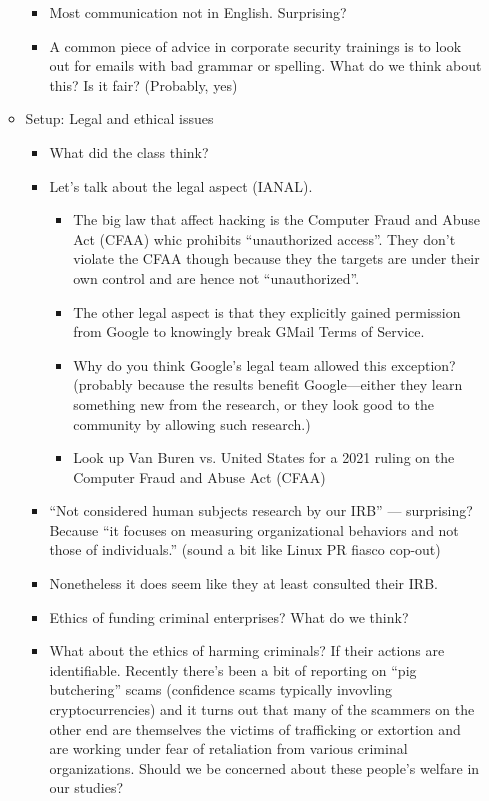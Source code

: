 \documentclass[11pt]{article}
\begin{document}
\begin{itemize}
\begin{itemize}
\begin{itemize}
            \item Most communication not in English. Surprising?
            \item A common piece of advice in corporate security trainings is to look out for emails with bad grammar or spelling. What do we think about this? Is it fair? (Probably, yes)
        \end{itemize}
        \item Setup: Legal and ethical issues
        \begin{itemize}
            \item What did the class think?
            \item Let's talk about the legal aspect (IANAL). 
            \begin{itemize}
                \item The big law that affect hacking is the Computer Fraud and Abuse Act (CFAA) whic prohibits ``unauthorized access''. They don't violate the CFAA though because they the targets are under their own control and are hence not ``unauthorized''.
                \item The other legal aspect is that they explicitly gained permission from Google to knowingly break GMail Terms of Service. 
                \item Why do you think Google's legal team allowed this exception? (probably because the results benefit Google---either they learn something new from the research, or they look good to the community by allowing such research.)
                \item Look up Van Buren vs. United States for a 2021 ruling on the Computer Fraud and Abuse Act (CFAA)
            \end{itemize}
            \item ``Not considered human subjects research by our IRB'' --- surprising? Because ``it focuses on measuring organizational behaviors and not those of individuals.'' (sound a bit like Linux PR fiasco cop-out)
            \item Nonetheless it does seem like they at least consulted their IRB.
            \item Ethics of funding criminal enterprises? What do we think?
            \item What about the ethics of harming criminals? If their actions are identifiable. Recently there's been a bit of reporting on ``pig butchering'' scams (confidence scams typically invovling cryptocurrencies) and it turns out that many of the scammers on the other end are themselves the victims of trafficking or extortion and are working under fear of retaliation from various criminal organizations. Should we be concerned about these people's welfare in our studies? 

\end{itemize}
\end{itemize}
\end{itemize}
\end{document}
